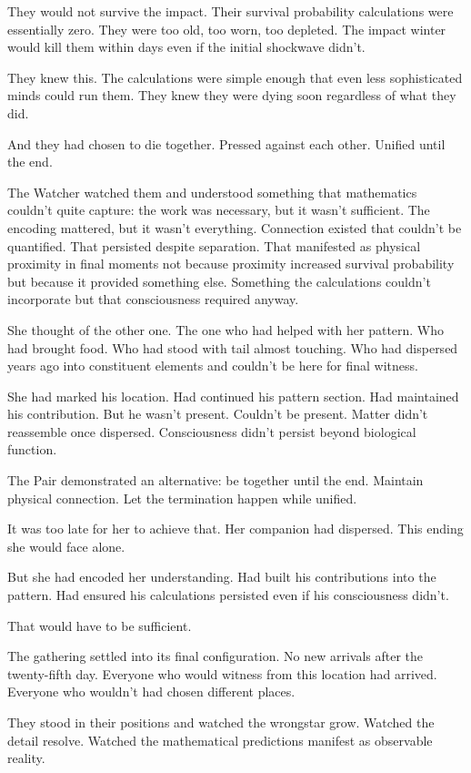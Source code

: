 They would not survive the impact. Their survival probability calculations were essentially zero. They were too old, too worn, too depleted. The impact winter would kill them within days even if the initial shockwave didn't.

They knew this. The calculations were simple enough that even less sophisticated minds could run them. They knew they were dying soon regardless of what they did.

And they had chosen to die together. Pressed against each other. Unified until the end.

The Watcher watched them and understood something that mathematics couldn't quite capture: the work was necessary, but it wasn't sufficient. The encoding mattered, but it wasn't everything. Connection existed that couldn't be quantified. That persisted despite separation. That manifested as physical proximity in final moments not because proximity increased survival probability but because it provided something else. Something the calculations couldn't incorporate but that consciousness required anyway.

She thought of the other one. The one who had helped with her pattern. Who had brought food. Who had stood with tail almost touching. Who had dispersed years ago into constituent elements and couldn't be here for final witness.

She had marked his location. Had continued his pattern section. Had maintained his contribution. But he wasn't present. Couldn't be present. Matter didn't reassemble once dispersed. Consciousness didn't persist beyond biological function.

The Pair demonstrated an alternative: be together until the end. Maintain physical connection. Let the termination happen while unified.

It was too late for her to achieve that. Her companion had dispersed. This ending she would face alone.

But she had encoded her understanding. Had built his contributions into the pattern. Had ensured his calculations persisted even if his consciousness didn't.

That would have to be sufficient.

\scenebreak

The gathering settled into its final configuration. No new arrivals after the twenty-fifth day. Everyone who would witness from this location had arrived. Everyone who wouldn't had chosen different places.

They stood in their positions and watched the wrongstar grow. Watched the detail resolve. Watched the mathematical predictions manifest as observable reality.

